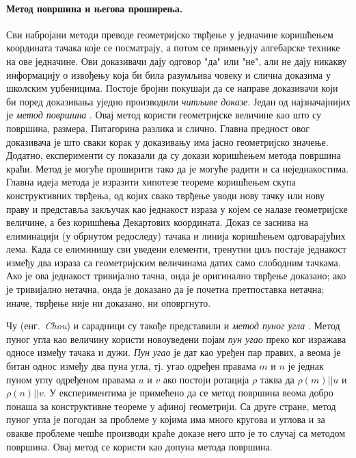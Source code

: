 \paragraph{Метод површина и његова проширења.}
Сви набројани методи преводе геометријско тврђење у једначине
коришћењем координата тачака које се посматрају, а потом се примењују
алгебарске технике на ове једначине. Ови доказивачи дају одговор "да"
или "не", али не дају никакву информацију о извођењу која би била
разумљива човеку и слична доказима у школским уџбеницима. Постоје
бројни покушаји да се направе доказивачи који би поред доказивања
уједно производили \emph{читљиве доказе}. Један од најзначајнијих је
\emph{метод површина} \cite{chou1993automated}. Овај метод користи
геометријске величине као што су површина, размера, Питагорина разлика
и слично. Главна предност овог доказивача је што сваки корак у
доказивању има јасно геометријско значење. Додатно, експерименти су
показали да су докази коришћењем метода површина краћи. Метод је
могуће проширити тако да је могуће радити и са неједнакостима. Главна
идеја метода је изразити хипотезе теореме коришћењем скупа
конструктивних тврђења, од којих свако тврђење уводи нову тачку или
нову праву и представља закључак као једнакост израза у којем се налазе
геометријске величине, а без коришћења Декартових координата. Доказ се
заснива на елиминацији (у обрнутом редоследу) тачака и линија
коришћењем одговарајућих лема. Када се елиминишу сви уведени елементи,
тренутни циљ постаје једнакост између два израза са геометријским
величинама датих само слободним тачкама. Ако је ова једнакост
тривијално тачна, онда је оригинално тврђење доказано; ако је
тривијално нетачна, онда је доказано да је почетна претпоставка
нетачна; иначе, тврђење није ни доказано, ни оповргнуто.

Чу (енг.~\emph{Chou}) и сарадници су такође представили и \emph{метод
  пуног угла} \cite{chou1996automated}. Метод пуног угла као величину
користи новоуведени појам \emph{пун угао} преко ког изражава односе
између тачака и дужи. \emph{Пун угао} је дат као уређен пар правих, а
веома је битан однос између два пуна угла, тј. угао одређен правама
$m$ и $n$ је једнак пуном углу одређеном правама $u$ и $v$ ако постоји
ротација $\rho$ таква да $\rho(m) || u$ и $\rho(n) || v$. У
експериментима је примећено да се метод површина веома добро понаша за
конструктивне теореме у афиној геометрији. Са друге стране, метод
пуног угла је погодан за проблеме у којима има много кругова и углова
и за овакве проблеме чешће производи краће доказе него што је то
случај са методом површина. Овај метод се користи као допуна метода
површина.

